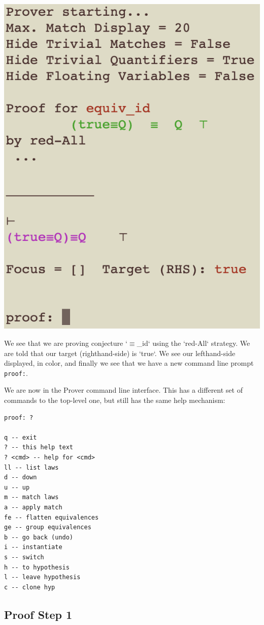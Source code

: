 \documentclass[11pt]{article}
\begin{document}
\includegraphics[scale=0.75]{doc/images/prover_starting.png}


We see that we are proving conjecture `$\equiv$\_id` using the `red-All` strategy. 
We are told that our target (righthand-side) is `true`.
We see our lefthand-side displayed, in color,
and finally we see that we have a new command line prompt \verb"proof:".

We are now in the Prover command line interface.
This has a different set of commands to the top-level one,
but still has the same help mechanism:

\begin{verbatim}
proof: ?

q -- exit
? -- this help text
? <cmd> -- help for <cmd>
ll -- list laws
d -- down
u -- up
m -- match laws
a -- apply match
fe -- flatten equivalences
ge -- group equivalences
b -- go back (undo)
i -- instantiate
s -- switch
h -- to hypothesis
l -- leave hypothesis
c -- clone hyp
\end{verbatim}

\newpage
\subsection{Proof Step 1}
\end{document}
